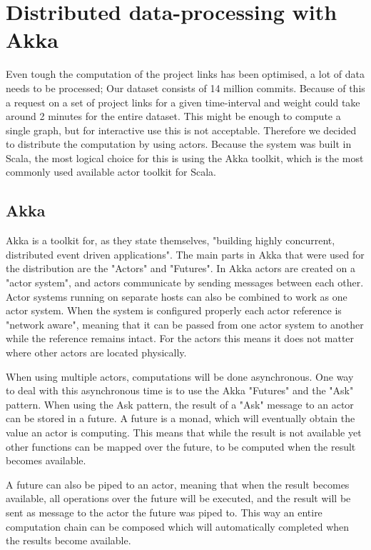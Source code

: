 \documentclass[10pt,a4paper]{article}
\begin{document}
\section{Distributed data-processing with Akka}\label{sec:distributed}
Even tough the computation of the project links has been optimised,  a lot of data needs to be processed; Our dataset consists of 14 million commits. Because of this a request on a set of project links for a given time-interval and weight could take around 2 minutes for the entire dataset. This might be enough to compute a single graph, but for interactive use this is not acceptable. Therefore we decided to distribute the computation by using actors. Because the system was built in Scala, the most logical choice for this is using the Akka toolkit, which is the most commonly used available actor toolkit for Scala.

\subsection{Akka}

Akka is a toolkit for, as they state themselves, "building highly concurrent, distributed event driven applications". The main parts in Akka that were used for the distribution are the "Actors" and "Futures". In Akka actors are created on a "actor system", and actors communicate by sending messages between each other. Actor systems running on separate hosts can also be combined to work as one actor system. When the system is configured properly each actor reference is "network aware", meaning that it can be passed from one actor system to another while the reference remains intact. For the actors this means it does not matter where other actors are located physically.

When using multiple actors, computations will be done asynchronous. One way to deal with this asynchronous time is to use the Akka "Futures" and the "Ask" pattern. When using the Ask pattern, the result of a "Ask" message to an actor can be stored in a future. A future is a monad, which will eventually obtain the value an actor is computing. This means that while the result is not available yet other functions can be mapped over the future, to be computed when the result becomes available. 

A future can also be piped to an actor, meaning that when the result becomes available, all operations over the future will be executed, and the result will be sent as message to the actor the future was piped to. This way an entire computation chain can be composed which will automatically completed when the results become available.
\end{document}
